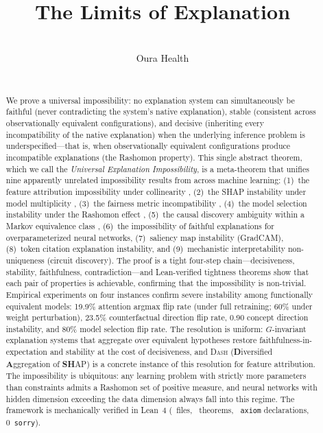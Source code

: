 \documentclass[twoside]{jmlr}
\title[The Limits of Explanation]{The Limits of Explanation}
\author{\Name{Drake Caraker} \Email{drake.caraker@ouraring.com}\\
       \addr Oura Health
       \AND
       \Name{Bryan Arnold}\\
       \addr [affiliation]
       \AND
       \Name{David Rhoads}\\
       \addr [affiliation]}
\newcommand{\DASH}{\textsc{Dash}}
\begin{document}
\maketitle

\begin{abstract}
We prove a universal impossibility: no explanation system can simultaneously be
faithful (never contradicting the system's native explanation), stable
(consistent across observationally equivalent configurations), and decisive
(inheriting every incompatibility of the native explanation) when
the underlying inference problem is underspecified---that is, when
observationally equivalent configurations produce incompatible explanations
(the Rashomon property).
This single abstract theorem, which we call the \emph{Universal Explanation
Impossibility}, is a meta-theorem that unifies nine apparently unrelated
impossibility results from across machine learning: (1)~the feature attribution
impossibility under collinearity \citep{bilodeau2024impossibility}, (2)~the
SHAP instability under model multiplicity \citep{damour2022underspecification},
(3)~the fairness metric incompatibility \citep{chouldechova2017fair,kleinberg2017inherent},
(4)~the model selection instability under the Rashomon effect
\citep{rudin2024amazing,fisher2019models}, (5)~the causal discovery ambiguity
within a Markov equivalence class \citep{verma1991equivalence},
(6)~the impossibility of faithful explanations for overparameterized neural networks,
(7)~saliency map instability (GradCAM), (8)~token citation explanation instability,
and (9)~mechanistic interpretability non-uniqueness (circuit discovery).
The proof is a tight four-step chain---decisiveness, stability, faithfulness,
contradiction---and Lean-verified tightness theorems show that each pair of
properties is achievable, confirming that the impossibility is non-trivial.
Empirical experiments on four instances confirm severe instability among
functionally equivalent models: 19.9\% attention argmax flip rate
(under full retraining; 60\% under weight perturbation), 23.5\%
counterfactual direction flip rate, 0.90 concept direction instability,
and 80\% model selection flip rate.
The resolution is uniform: $G$-invariant explanation systems that aggregate
over equivalent hypotheses restore faithfulness-in-expectation and stability at
the cost of decisiveness, and \DASH{} (\textbf{D}iversified \textbf{A}ggregation of
\textbf{SH}AP) is a concrete instance of this resolution for feature attribution.
The impossibility is ubiquitous: any learning problem with strictly more
parameters than constraints admits a Rashomon set of positive measure, and
neural networks with hidden dimension exceeding the data dimension always fall
into this regime.
The framework is mechanically verified in Lean~4 (\ClaimMainFiles~files, \ClaimMainTheorems~theorems,
\ClaimMainAxioms~\texttt{axiom} declarations, 0~\texttt{sorry}).
\end{abstract}
\end{document}
